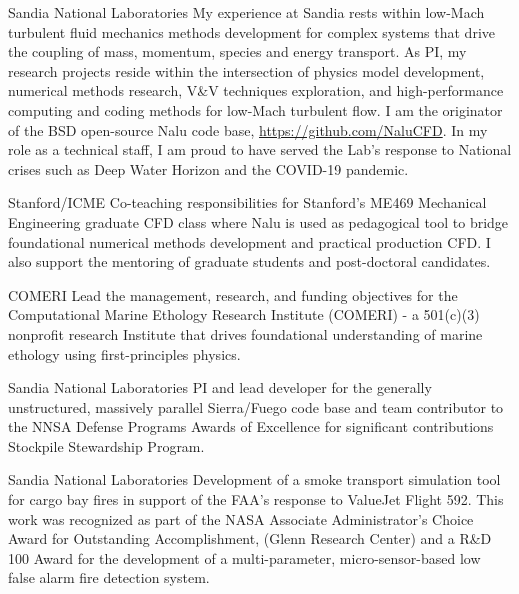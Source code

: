 \documentclass[letterpaper]{twentysecondcv_spd} %
\begin{document}
\begin{twenty} %
    {Sandia National Laboratories} {My experience at Sandia rests within low-Mach 
    turbulent fluid mechanics methods development for complex systems that drive the coupling of mass, momentum, species and energy transport. 
    As PI, my research projects reside within the intersection of physics model development, numerical methods research, V\&V techniques exploration, and 
    high-performance computing and coding methods for low-Mach turbulent flow. I am the originator of the BSD open-source Nalu
    code base, \underline{https://github.com/NaluCFD}. In my role as a technical staff, I am proud to have served the Lab's response to National crises 
    such as Deep Water Horizon and the COVID-19 pandemic.}
   
    {Stanford/ICME} {Co-teaching responsibilities for Stanford's ME469 Mechanical Engineering graduate CFD 
   class where Nalu is used as pedagogical tool to bridge foundational numerical methods development and practical production CFD. I also support the 
   mentoring of graduate students and post-doctoral candidates.}

    {COMERI} {Lead the management, research, and funding objectives
    for the Computational Marine Ethology Research Institute (COMERI) - a 501(c)(3) nonprofit research Institute that drives 
    foundational understanding of marine ethology using first-principles physics.}
    
   {Sandia National Laboratories}  {PI
    and lead developer for the generally unstructured, massively parallel Sierra/Fuego code base and team contributor to the NNSA Defense Programs Awards of Excellence for 
    significant contributions Stockpile Stewardship Program.}
    
   {Sandia National Laboratories}  {Development of a smoke transport simulation tool for cargo bay 
  fires in support of the FAA's response to ValueJet Flight 592. This work was recognized as part of the NASA Associate Administrator's Choice Award for Outstanding Accomplishment, (Glenn Research Center) 
  and a R\&D 100 Award for the development of a multi-parameter, micro-sensor-based low false alarm fire detection system.}
  
\end{twenty}
\end{document}
